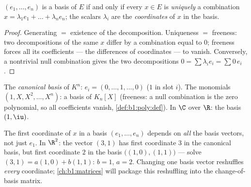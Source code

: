 \begin{proposition}[Coordinates]\label{prop:b1:vspaces:coordinates}
$(e_1, \dots, e_n)$ is a basis of $E$ if and only if every $x \in E$
is \emph{uniquely} a combination $x = \lambda_1 e_1 + \dots +
\lambda_n e_n$; the scalars $\lambda_i$ are the
\emph{coordinates} of $x$ in the basis.
\end{proposition}

\begin{proof}
Generating $=$ existence of the decomposition. Uniqueness $=$
freeness: two decompositions of the same $x$ differ by a combination
equal to $0$; freeness forces all its coefficients --- the
differences of coordinates --- to vanish. Conversely, a nontrivial
null combination gives the two decompositions $0 = \sum \lambda_i
e_i = \sum 0\,e_i$.
\end{proof}

\begin{example}\label{ex:b1:vspaces:bases}
The \emph{canonical basis} of $K^n$: $e_i = (0, \dots, 1, \dots, 0)$
($1$ in slot $i$). The monomials $(1, X, X^2, \dots, X^n)$: a basis
of $K_n[X]$ (freeness: a null combination is the zero polynomial, so
all coefficients vanish, \cref{def:b1:poly:def}). In
$\C$ over $\R$: the basis $(1, \iu)$.
\end{example}

\begin{remark}
\label{rem:b1:vspaces:teameffort}
The first coordinate of $x$ in a basis $(e_1, \dots, e_n)$
depends on \emph{all} the basis vectors, not just $e_1$. In
$\R^2$: the vector $(3, 1)$ has first coordinate $3$ in the
canonical basis, but first coordinate $2$ in the basis
$\bigl((1,0), (1,1)\bigr)$ --- solve $(3,1) = a(1,0) + b(1,1)$:
$b = 1$, $a = 2$. Changing one basis vector reshuffles
\emph{every} coordinate; \cref{ch:b1:matrices} will package this
reshuffling into the change-of-basis matrix.
\end{remark}

